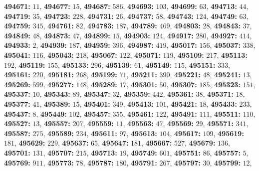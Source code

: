\textsf{\bfseries 494671:} $11$, \textsf{\bfseries 494677:} $15$, \textsf{\bfseries 494687:} $586$, \textsf{\bfseries 494693:} $103$, \textsf{\bfseries 494699:} $63$, \textsf{\bfseries 494713:} $44$, \textsf{\bfseries 494719:} $35$, \textsf{\bfseries 494723:} $228$, \textsf{\bfseries 494731:} $26$, \textsf{\bfseries 494737:} $58$, \textsf{\bfseries 494743:} $124$, \textsf{\bfseries 494749:} $63$, \textsf{\bfseries 494759:} $345$, \textsf{\bfseries 494761:} $82$, \textsf{\bfseries 494783:} $187$, \textsf{\bfseries 494789:} $469$, \textsf{\bfseries 494803:} $28$, \textsf{\bfseries 494843:} $37$, \textsf{\bfseries 494849:} $48$, \textsf{\bfseries 494873:} $47$, \textsf{\bfseries 494899:} $15$, \textsf{\bfseries 494903:} $124$, \textsf{\bfseries 494917:} $280$, \textsf{\bfseries 494927:} $414$, \textsf{\bfseries 494933:} $2$, \textsf{\bfseries 494939:} $187$, \textsf{\bfseries 494959:} $396$, \textsf{\bfseries 494987:} $419$, \textsf{\bfseries 495017:} $156$, \textsf{\bfseries 495037:} $338$, \textsf{\bfseries 495041:} $116$, \textsf{\bfseries 495043:} $218$, \textsf{\bfseries 495067:} $122$, \textsf{\bfseries 495071:} $119$, \textsf{\bfseries 495109:} $217$, \textsf{\bfseries 495113:} $192$, \textsf{\bfseries 495119:} $155$, \textsf{\bfseries 495133:} $296$, \textsf{\bfseries 495139:} $61$, \textsf{\bfseries 495149:} $115$, \textsf{\bfseries 495151:} $333$, \textsf{\bfseries 495161:} $220$, \textsf{\bfseries 495181:} $268$, \textsf{\bfseries 495199:} $71$, \textsf{\bfseries 495211:} $390$, \textsf{\bfseries 495221:} $48$, \textsf{\bfseries 495241:} $13$, \textsf{\bfseries 495269:} $599$, \textsf{\bfseries 495277:} $148$, \textsf{\bfseries 495289:} $17$, \textsf{\bfseries 495301:} $50$, \textsf{\bfseries 495307:} $185$, \textsf{\bfseries 495323:} $151$, \textsf{\bfseries 495337:} $10$, \textsf{\bfseries 495343:} $89$, \textsf{\bfseries 495347:} $32$, \textsf{\bfseries 495359:} $442$, \textsf{\bfseries 495361:} $38$, \textsf{\bfseries 495371:} $18$, \textsf{\bfseries 495377:} $41$, \textsf{\bfseries 495389:} $15$, \textsf{\bfseries 495401:} $349$, \textsf{\bfseries 495413:} $101$, \textsf{\bfseries 495421:} $18$, \textsf{\bfseries 495433:} $233$, \textsf{\bfseries 495437:} $8$, \textsf{\bfseries 495449:} $102$, \textsf{\bfseries 495457:} $355$, \textsf{\bfseries 495461:} $122$, \textsf{\bfseries 495491:} $111$, \textsf{\bfseries 495511:} $110$, \textsf{\bfseries 495527:} $13$, \textsf{\bfseries 495557:} $207$, \textsf{\bfseries 495559:} $11$, \textsf{\bfseries 495563:} $47$, \textsf{\bfseries 495569:} $29$, \textsf{\bfseries 495571:} $341$, \textsf{\bfseries 495587:} $275$, \textsf{\bfseries 495589:} $234$, \textsf{\bfseries 495611:} $97$, \textsf{\bfseries 495613:} $104$, \textsf{\bfseries 495617:} $109$, \textsf{\bfseries 495619:} $181$, \textsf{\bfseries 495629:} $229$, \textsf{\bfseries 495637:} $65$, \textsf{\bfseries 495647:} $181$, \textsf{\bfseries 495667:} $527$, \textsf{\bfseries 495679:} $136$, \textsf{\bfseries 495701:} $131$, \textsf{\bfseries 495707:} $215$, \textsf{\bfseries 495713:} $19$, \textsf{\bfseries 495749:} $601$, \textsf{\bfseries 495751:} $86$, \textsf{\bfseries 495757:} $5$, \textsf{\bfseries 495769:} $911$, \textsf{\bfseries 495773:} $78$, \textsf{\bfseries 495787:} $180$, \textsf{\bfseries 495791:} $267$, \textsf{\bfseries 495797:} $30$, \textsf{\bfseries 495799:} $12$, 
